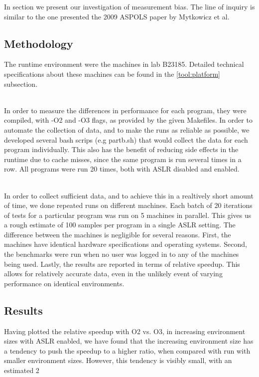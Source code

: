 \documentclass{article}
\begin{document}
In section we present our investigation of measurement bias. The line of inquiry is similar to the one presented the 2009 ASPOLS paper by Mytkowicz et al.

\subsection{Methodology}
The runtime environment were the machines in lab B23185. Detailed technical specifications about these machines can be found in the \ref{tool:platform} subsection.

\\
In order to measure the differences in performance for each program, they were compiled, with -O2 and -O3 flags, as provided by the given Makefiles. In order to automate the collection of data, and to make the runs as reliable as possible, we developed several bash scrips (e.g partb.sh) that would collect the data for each program individually. This also has the benefit of reducing side effects in the runtime due to cache misses, since the same program is run several times in a row. All programs were run 20 times, both with ASLR disabled and enabled.

\\
In order to collect sufficient data, and to achieve this in a realtively short amount of time, we done repeated runs on different machines. Each batch of 20 iterations of tests for a particular program was run on 5 machines in parallel. This gives us a rough estimate of 100 samples per program in a single ASLR setting. The difference between the machines is negligible for several reasons. First, the machines have identical hardware specifications and operating systems. Second, the benchmarks were run when no user was logged in to any of the machines being used. Lastly, the results are reported in terms of relative speedup. This allows for relatively accurate data, even in the unlikely event of varying performance on identical environments.

\subsection{Results}

Having plotted the relative speedup with O2 vs. O3, in increasing environment sizes with ASLR enabled, we have found that the increasing environment size has a tendency to push the speedup to a higher ratio, when compared with run with smaller environment sizes. However, this tendency is visibly small, with an estimated 2%
\end{document}

